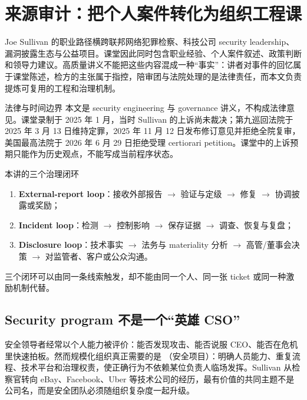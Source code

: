 \documentclass[a4paper]{article}
\begin{document}
\makecscover

\section{来源审计：把个人案件转化为组织工程课}

Joe Sullivan 的职业路径横跨联邦网络犯罪检察、科技公司 security leadership、漏洞披露生态与公益项目。课堂因此同时包含职业经验、个人案件叙述、政策判断和领导力建议。高质量讲义不能把这些内容混成一种“事实”：讲者对事件的回忆属于课堂陈述，检方的主张属于指控，陪审团与法院处理的是法律责任，而本文负责提炼可复用的工程和治理机制。

\begin{warningbox}{法律与时间边界}
本文是 security engineering 与 governance 讲义，不构成法律意见。课堂录制于 2025 年 1 月，当时 Sullivan 的上诉尚未裁决；第九巡回法院于 2025 年 3 月 13 日维持定罪，2025 年 11 月 12 日发布修订意见并拒绝全院复审，美国最高法院于 2026 年 6 月 29 日拒绝受理 certiorari petition。课堂中的上诉预期只能作为历史观点，不能写成当前程序状态。
\end{warningbox}

\begin{importantbox}{本讲的三个治理闭环}
\begin{enumerate}
  \item \textbf{External-report loop}：接收外部报告 $\rightarrow$ 验证与定级 $\rightarrow$ 修复 $\rightarrow$ 协调披露或奖励；
  \item \textbf{Incident loop}：检测 $\rightarrow$ 控制影响 $\rightarrow$ 保存证据 $\rightarrow$ 调查、恢复与复盘；
  \item \textbf{Disclosure loop}：技术事实 $\rightarrow$ 法务与 materiality 分析 $\rightarrow$ 高管/董事会决策 $\rightarrow$ 对监管者、客户或公众沟通。
\end{enumerate}
三个闭环可以由同一条线索触发，却不能由同一个人、同一张 ticket 或同一种激励机制代替。
\end{importantbox}

\subsection{Security program 不是一个“英雄 CSO”}

安全领导者经常以个人能力被评价：能否发现攻击、能否说服 CEO、能否在危机里快速拍板。然而规模化组织真正需要的是 （安全项目）：明确人员能力、重复流程、技术平台和治理权责，使正确行为不依赖某位负责人临场发挥。Sullivan 从检察官转向 eBay、Facebook、Uber 等技术公司的经历，最有价值的共同主题不是公司名，而是安全团队必须随组织复杂度一起升级。
\end{document}
